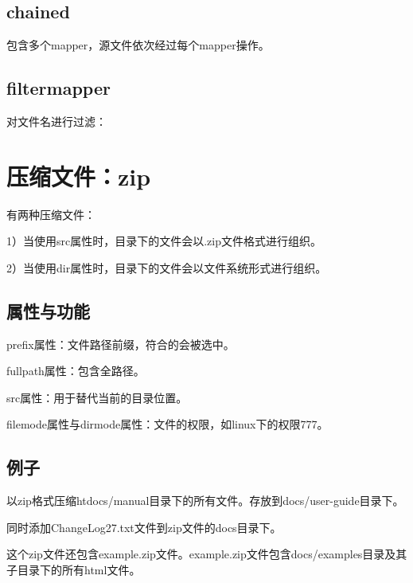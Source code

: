 		

	\subsection{chained}

		包含多个mapper，源文件依次经过每个mapper操作。
		
		

	\subsection{filtermapper}

		对文件名进行过滤：
		
		
	
\section{压缩文件：zip}
	
	有两种压缩文件：

	1）当使用src属性时，目录下的文件会以.zip文件格式进行组织。

	2）当使用dir属性时，目录下的文件会以文件系统形式进行组织。

	\subsection{属性与功能}
		
		prefix属性：文件路径前缀，符合的会被选中。

		fullpath属性：包含全路径。

		src属性：用于替代当前的目录位置。

		filemode属性与dirmode属性：文件的权限，如linux下的权限777。

	\subsection{例子}

		以zip格式压缩htdocs/manual目录下的所有文件。存放到docs/user-guide目录下。

		同时添加ChangeLog27.txt文件到zip文件的docs目录下。

		这个zip文件还包含example.zip文件。example.zip文件包含docs/examples目录及其子目录下的所有html文件。
		
		

